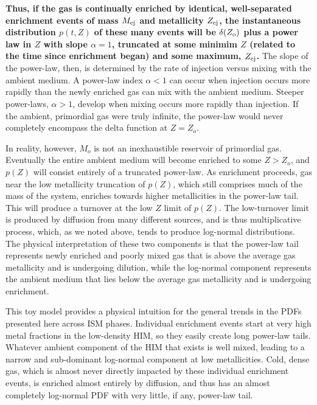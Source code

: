 \documentclass[twocolumn]{aastex61}
\begin{document}
\textbf{Thus, if the gas is continually enriched by identical, well-separated enrichment events of mass $M_{\rm ej}$ and metallicity $Z_{\rm ej}$, the instantaneous distribution $p(t,Z)$
of these many events will be $\delta(Z_{\rm o})$ plus a power law in $Z$ with slope $\alpha = 1$, truncated at some minimim $Z$ (related to the time since enrichment began) and some maximum, $Z_{\rm ej}$.}
The slope of the power-law, then, is determined by the rate of injection versus mixing with the ambient medium. A power-law index $\alpha < 1$ can occur when injection occurs more rapidly than the newly enriched gas can mix with the ambient medium. Steeper power-laws, $\alpha > 1$, develop when mixing occurs more rapidly than 
         injection.
If the ambient, primordial gas were truly infinite, the power-law would never completely encompass the delta function at $Z = Z_o$.

In reality, however, $M_o$ is not an inexhaustible reservoir of primordial gas. Eventually the entire ambient medium will become enriched to some $Z > Z_o$, and $p(Z)$ will consist entirely of a truncated power-law. As enrichment proceeds, gas near the low metallicity truncation of $p(Z)$, which still comprises much of the mass of the system, enriches towards higher metallicities in the power-law tail. This will produce a turnover at the low $Z$ limit of $p(Z)$. The low-turnover limit is produced by diffusion from many different sources, and is thus multiplicative process, which, as we noted above, tends to produce log-normal distributions. 
The physical interpretation of these two components is that the power-law tail represents newly enriched and poorly mixed gas that is above the average gas metallicity and is undergoing dilution, while the log-normal component represents the ambient medium that lies below the average gas metallicity and is undergoing enrichment.

This toy model provides a physical intuition for the general trends in the PDFs presented here across ISM phases. 
     Individual enrichment events start at very high metal fractions in the low-density HIM, 
     so they easily create long power-law tails.
Whatever ambient component of the HIM that exists is well mixed, leading to a narrow and sub-dominant log-normal component at low metallicities. Cold, dense gas, which is almost never directly impacted by these individual enrichment events, is enriched almost entirely by diffusion, and thus has an almost completely log-normal PDF with very little, if any, power-law tail.
\end{document}
